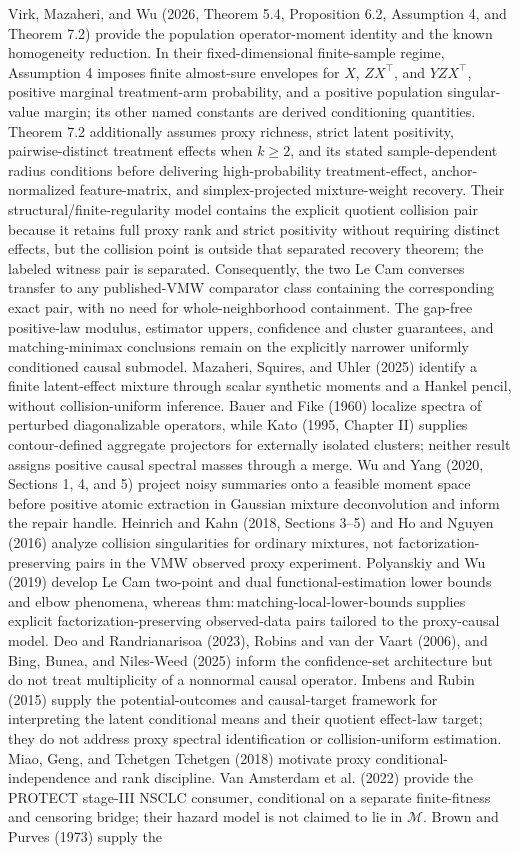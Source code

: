 \documentclass{article}
\begin{document}
Virk, Mazaheri, and Wu (2026, Theorem 5.4, Proposition 6.2, Assumption 4, and Theorem 7.2) provide the population operator-moment identity and the known homogeneity reduction.  In their fixed-dimensional finite-sample regime, Assumption 4 imposes finite almost-sure envelopes for \(X\), \(ZX^\top\), and \(YZX^\top\), positive marginal treatment-arm probability, and a positive population singular-value margin; its other named constants are derived conditioning quantities.  Theorem 7.2 additionally assumes proxy richness, strict latent positivity, pairwise-distinct treatment effects when \(k\ge2\), and its stated sample-dependent radius conditions before delivering high-probability treatment-effect, anchor-normalized feature-matrix, and simplex-projected mixture-weight recovery.  Their structural/finite-regularity model contains the explicit quotient collision pair because it retains full proxy rank and strict positivity without requiring distinct effects, but the collision point is outside that separated recovery theorem; the labeled witness pair is separated. Consequently, the two Le Cam converses transfer to any published-VMW comparator class containing the corresponding exact pair, with no need for whole-neighborhood containment. The gap-free positive-law modulus, estimator uppers, confidence and cluster guarantees, and matching-minimax conclusions remain on the explicitly narrower uniformly conditioned causal submodel. Mazaheri, Squires, and Uhler (2025) identify a finite latent-effect mixture through scalar synthetic moments and a Hankel pencil, without collision-uniform inference. Bauer and Fike (1960) localize spectra of perturbed diagonalizable operators, while Kato (1995, Chapter II) supplies contour-defined aggregate projectors for externally isolated clusters; neither result assigns positive causal spectral masses through a merge. Wu and Yang (2020, Sections 1, 4, and 5) project noisy summaries onto a feasible moment space before positive atomic extraction in Gaussian mixture deconvolution and inform the repair handle. Heinrich and Kahn (2018, Sections 3--5) and Ho and Nguyen (2016) analyze collision singularities for ordinary mixtures, not factorization-preserving pairs in the VMW observed proxy experiment. Polyanskiy and Wu (2019) develop Le Cam two-point and dual functional-estimation lower bounds and elbow phenomena, whereas \(\mathrm{thm:matching\text{-}local\text{-}lower\text{-}bounds}\) supplies explicit factorization-preserving observed-data pairs tailored to the proxy-causal model. Deo and Randrianarisoa (2023), Robins and van der Vaart (2006), and Bing, Bunea, and Niles-Weed (2025) inform the confidence-set architecture but do not treat multiplicity of a nonnormal causal operator. Imbens and Rubin (2015) supply the potential-outcomes and causal-target framework for interpreting the latent conditional means and their quotient effect-law target; they do not address proxy spectral identification or collision-uniform estimation. Miao, Geng, and Tchetgen Tchetgen (2018) motivate proxy conditional-independence and rank discipline. Van Amsterdam et al. (2022) provide the PROTECT stage-III NSCLC consumer, conditional on a separate finite-fitness and censoring bridge; their hazard model is not claimed to lie in \(\mathcal M\). Brown and Purves (1973) supply the 
\end{document}
